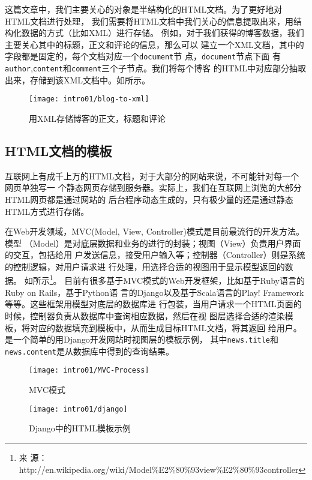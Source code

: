 这篇文章中，我们主要关心的对象是半结构化的HTML文档。为了更好地对HTML文档进行处理，
我们需要将HTML文档中我们关心的信息提取出来，用结构化数据的方式（比如XML）进行存储。
例如，对于我们获得的博客数据，我们主要关心其中的标题，正文和评论的信息，那么可以
建立一个XML文档，其中的字段都是固定的，每个文档对应一个\texttt{document}节
点，\texttt{document}节点下面
有\texttt{author},\texttt{content}和\texttt{comment}三个子节点。我们将每个博客
的HTML中对应部分抽取出来，存储到该XML文档中。如所示。
\begin{figure}
  \centering
  \texttt{[image: intro01/blog-to-xml]}
  \caption{用XML存储博客的正文，标题和评论}
  \label{intro:fig:blog-to-xml}
\end{figure}

\subsection{HTML文档的模板}
\label{sec:htmltemplateintro}
互联网上有成千上万的HTML文档，对于大部分的网站来说，不可能针对每一个网页单独写一
个静态网页存储到服务器。实际上，我们在互联网上浏览的大部分HTML网页都是通过网站的
后台程序动态生成的，只有极少量的还是通过静态HTML方式进行存储。

在Web开发领域，MVC(Model, View, Controller)模式是目前最流行的开发方法。模型
（Model）是对底层数据和业务的进行的封装；视图（View）负责用户界面的交互，包括给用
户发送信息，接受用户输入等；控制器（Controller）则是系统的控制逻辑，对用户请求进
行处理，用选择合适的视图用于显示模型返回的数据。
如所示\footnote{来
  源：http://en.wikipedia.org/wiki/Model\%E2\%80\%93view\%E2\%80\%93controller}。
目前有很多基于MVC模式的Web开发框架，比如基于Ruby语言的Ruby on Rails，基于Python语
言的Django以及基于Scala语言的Play! Framework等等。这些框架用模型对底层的数据库进
行包装，当用户请求一个HTML页面的时候，控制器负责从数据库中查询相应数据，然后在视
图层选择合适的渲染模板，将对应的数据填充到模板中，从而生成目标HTML文档，将其返回
给用户。是一个简单的用Django开发网站时视图层的模板示例，
其中\texttt{news.title}和\texttt{news.content}是从数据库中得到的查询结果。
\begin{figure}
  \begin{minipage}[t]{0.5\linewidth}
  \centering
  \texttt{[image: intro01/MVC-Process]}
  \caption{MVC模式}
  \label{intro:fig:mvc}
  \end{minipage}
  \begin{minipage}[t]{0.5\linewidth}
  \centering
  \texttt{[image: intro01/django]}
  \caption{Django中的HTML模板示例}
  \label{intro:fig:django}
  \end{minipage}
\end{figure}

